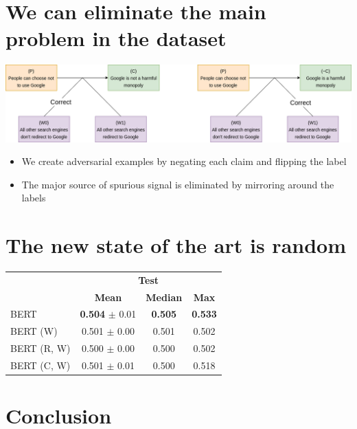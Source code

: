 \documentclass[a0,portrait]{a0poster}
\begin{document}
\begin{multicols}{2}
\section*{We can eliminate the main problem in the dataset}

\vspace{8pt}

\begin{center}
  \includegraphics[width=0.8\linewidth]{adversarial-data.png}
\end{center}

\vspace{8pt}

\begin{itemize}
    \item We create adversarial examples by negating each claim and flipping the label
    \item The major source of spurious signal is eliminated by mirroring around the labels
\end{itemize}

\section*{The new state of the art is random}

\vspace{8pt}

\begin{center}
\begin{tabular}{|l|ccc|}
\hline
\multirow{2}{*}{} & \multicolumn{3}{c|}{\textbf{Test}} \\
& \textbf{Mean} & \textbf{Median} & \textbf{Max} \\
\hline
BERT & \textbf{0.504} $\pm$ 0.01 & \textbf{0.505} & \textbf{0.533} \\
BERT (W) & 0.501 $\pm$ 0.00 & 0.501 & 0.502 \\
BERT (R, W) & 0.500 $\pm$ 0.00 & 0.500 & 0.502 \\
BERT (C, W) & 0.501 $\pm$ 0.01 & 0.500 & 0.518 \\
\hline
\end{tabular}
\end{center}

\section*{Conclusion}


\end{multicols}
\end{document}
